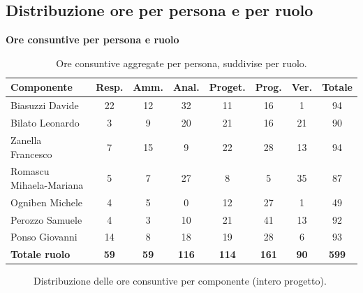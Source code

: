 \documentclass[a4paper, 11pt, oneside]{scrartcl} %
\begin{document}
\subsection{Distribuzione ore per persona e per ruolo}

\begin{table}[!ht]
\centering
{\large \textbf{Ore consuntive per persona e ruolo}} \\
\vspace{0.3cm}
\renewcommand{\arraystretch}{1.3}
\begin{tabular}{|l|c|c|c|c|c|c|c|}
\hline
\textbf{Componente} & \textbf{Resp.} & \textbf{Amm.} & \textbf{Anal.} & \textbf{Proget.} & \textbf{Prog.} & \textbf{Ver.} & \textbf{Totale} \\
\hline
Biasuzzi Davide         & 22 & 12 & 32 & 11 & 16 & 1 & 94 \\
Bilato Leonardo         & 3 & 9 & 20 & 21 & 16 & 21 & 90 \\
Zanella Francesco       & 7 & 15 & 9 & 22 & 28 & 13 & 94 \\
Romascu Mihaela-Mariana & 5 & 7 & 27 & 8 & 5 & 35 & 87 \\
Ogniben Michele         & 4 & 5 & 0 & 12 & 27 & 1 & 49 \\
Perozzo Samuele         & 4 & 3 & 10 & 21 & 41 & 13 & 92 \\
Ponso Giovanni          & 14 & 8 & 18 & 19 & 28 & 6 & 93 \\
\hline
\rowcolor{blue!10}
\textbf{Totale ruolo}   & \textbf{59} & \textbf{59} & \textbf{116} & \textbf{114} & \textbf{161} & \textbf{90} & \textbf{599} \\
\hline
\end{tabular}
\caption{Ore consuntive aggregate per persona, suddivise per ruolo.}
\label{tab:ore_persona_ruolo_finale}
\end{table}
\FloatBarrier

\begin{figure}[!ht]
\centering
{}
\caption{Distribuzione delle ore consuntive per componente (intero progetto).}
\label{fig:pie_ore_persona_finale}
\end{figure}
\FloatBarrier
\end{document}
